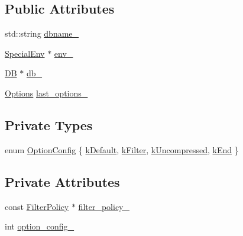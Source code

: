 \subsection*{Public Attributes}
\begin{DoxyCompactItemize}
\item 
std\-::string \hyperlink{classleveldb_1_1_d_b_test_ab7eb9815f522ad154816d72d1cc23a86}{dbname\-\_\-}
\item 
\hyperlink{classleveldb_1_1_special_env}{Special\-Env} $\ast$ \hyperlink{classleveldb_1_1_d_b_test_ae6bb66675fe5419ed647efd1bfd332f8}{env\-\_\-}
\item 
\hyperlink{classleveldb_1_1_d_b}{D\-B} $\ast$ \hyperlink{classleveldb_1_1_d_b_test_a2c3db8773f1aa15128432a87489b0d5a}{db\-\_\-}
\item 
\hyperlink{structleveldb_1_1_options}{Options} \hyperlink{classleveldb_1_1_d_b_test_adc05df912917d8de411d0672af04330f}{last\-\_\-options\-\_\-}
\end{DoxyCompactItemize}
\subsection*{Private Types}
\begin{DoxyCompactItemize}
\item 
enum \hyperlink{classleveldb_1_1_d_b_test_ade8d30892ac3c99c2a0488c119ef25e7}{Option\-Config} \{ \hyperlink{classleveldb_1_1_d_b_test_ade8d30892ac3c99c2a0488c119ef25e7a163b47baf2cf721dd67803249ea82afe}{k\-Default}, 
\hyperlink{classleveldb_1_1_d_b_test_ade8d30892ac3c99c2a0488c119ef25e7a649624cfa983dc6f8cc4374f936a8e65}{k\-Filter}, 
\hyperlink{classleveldb_1_1_d_b_test_ade8d30892ac3c99c2a0488c119ef25e7a7ca42a127723e396d8ae74dd46d3515e}{k\-Uncompressed}, 
\hyperlink{classleveldb_1_1_d_b_test_ade8d30892ac3c99c2a0488c119ef25e7a9139cb3a45f68d68e214eeaebb8c60d9}{k\-End}
 \}
\end{DoxyCompactItemize}
\subsection*{Private Attributes}
\begin{DoxyCompactItemize}
\item 
const \hyperlink{classleveldb_1_1_filter_policy}{Filter\-Policy} $\ast$ \hyperlink{classleveldb_1_1_d_b_test_aa4bc31daa4cd4def3163c638f623d101}{filter\-\_\-policy\-\_\-}
\item 
int \hyperlink{classleveldb_1_1_d_b_test_a3cc39d9674e4e47e2be82b023f791bd0}{option\-\_\-config\-\_\-}
\end{DoxyCompactItemize}


